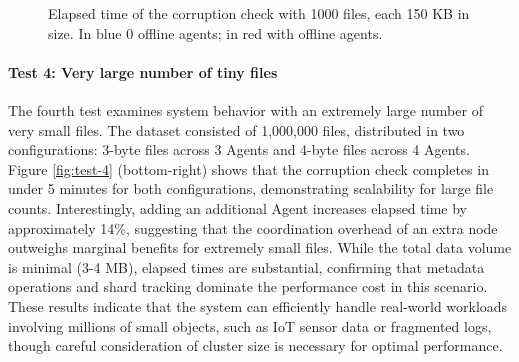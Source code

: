 \begin{figure}[!ht]
\centering
{}
\caption{Elapsed time of the corruption check with 1000 files, each 150 KB in
    size. In blue 0 offline agents; in red with offline
    agents.}
\label{fig:test-3}
\end{figure}

\newpage
\paragraph{Test 4: Very large number of tiny files}

The fourth test examines system behavior with an extremely large number of very
small files. The dataset consisted of 1,000,000 files, distributed in two
configurations: 3-byte files across 3 Agents and 4-byte files across 4 Agents.
Figure \ref{fig:test-4} (bottom-right) shows that the corruption check completes in under 5 minutes for both configurations, demonstrating scalability for large file counts. Interestingly, adding an additional Agent increases elapsed time by approximately 14\%, suggesting that the coordination overhead of an extra node outweighs marginal benefits for extremely small files. While the total data volume is minimal (3-4 MB), elapsed times are substantial, confirming that metadata operations and shard tracking dominate the performance cost in this scenario. These results indicate that the system can efficiently handle real-world workloads involving millions of small objects, such as IoT sensor data or fragmented logs, though careful consideration of cluster size is necessary for optimal performance.

